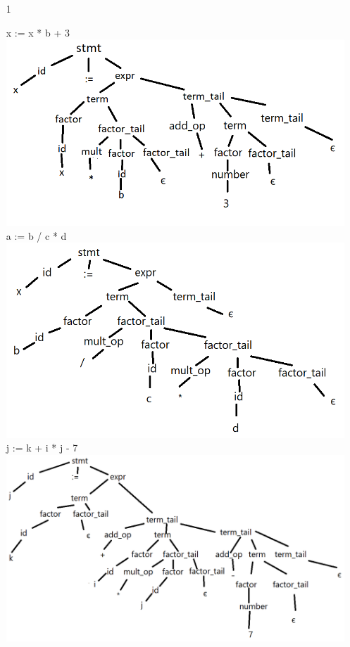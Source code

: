 \documentclass[12pt]{article}
\begin{document}
\pagestyle{fancy}  \chead{\textcolor{red}{02/22/2019}}
\rhead{\textcolor{red}{Austin Klum}} 
\lfoot{} \cfoot{} \rfoot{}

\begin{enumerate}
	\item[1]
	\item[]
		x := x * b + 3\\
		\includegraphics[scale=.5]{hw01-1a.png}\\
		a := b / c * d\\
		\includegraphics[scale=.5]{hw01-1b.png}\\
		j := k + i * j - 7\\
		\includegraphics[scale=.5]{hw01-1c.png}\\

\end{enumerate}
\end{document}
